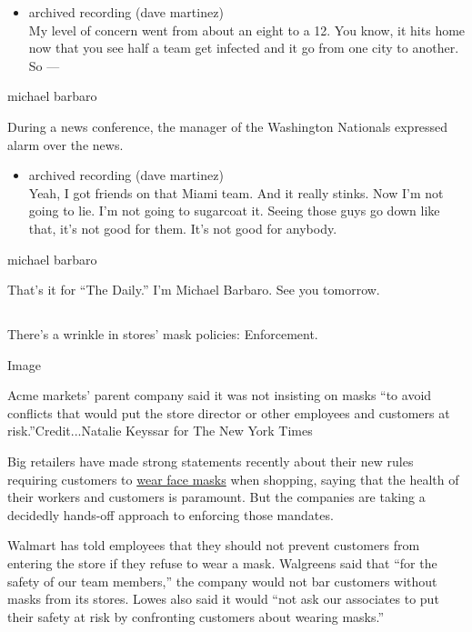 \begin{itemize}
\tightlist
\item
  archived recording (dave martinez)\\
  My level of concern went from about an eight to a 12. You know, it
  hits home now that you see half a team get infected and it go from one
  city to another. So ---
\end{itemize}

michael barbaro

During a news conference, the manager of the Washington Nationals
expressed alarm over the news.

\begin{itemize}
\tightlist
\item
  archived recording (dave martinez)\\
  Yeah, I got friends on that Miami team. And it really stinks. Now I'm
  not going to lie. I'm not going to sugarcoat it. Seeing those guys go
  down like that, it's not good for them. It's not good for anybody.
\end{itemize}

michael barbaro

That's it for ``The Daily.'' I'm Michael Barbaro. See you tomorrow.

\hypertarget{-3}{%
\subsection{}\label{-3}}

There's a wrinkle in stores' mask policies: Enforcement.

Image

Acme markets' parent company said it was not insisting on masks ``to
avoid conflicts that would put the store director or other employees and
customers at risk.''Credit...Natalie Keyssar for The New York Times

Big retailers have made strong statements recently about their new rules
requiring customers to
\href{https://www.nytimes3xbfgragh.onion/article/which-stores-require-masks.html?searchResultPosition=3}{wear
face masks} when shopping, saying that the health of their workers and
customers is paramount. But the companies are taking a decidedly
hands-off approach to enforcing those mandates.

Walmart has told employees that they should not prevent customers from
entering the store if they refuse to wear a mask. Walgreens said that
``for the safety of our team members,'' the company would not bar
customers without masks from its stores. Lowes also said it would ``not
ask our associates to put their safety at risk by confronting customers
about wearing masks.''

